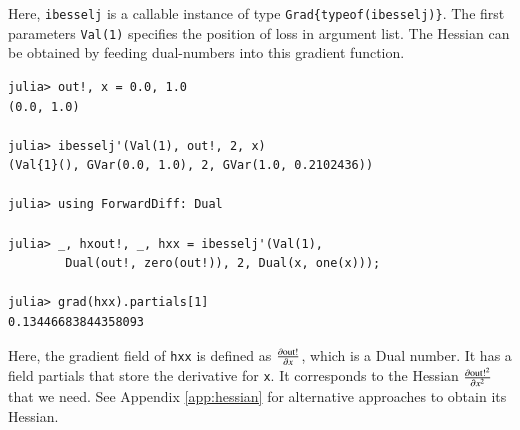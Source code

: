 \documentclass[aps,twocolumn,longbibliography,english,superscriptaddress]{revtex4-1}
\newcommand{\<}{\langle}
\renewcommand{\>}{\rangle}
\newcommand{\App}[1]{Appendix \ref{#1}}
\theoremstyle{definition}\newtheorem{definition}{\textit{Definition}}
\begin{document}
Here, \texttt{ibesselj\textquotesingle} is a callable instance of type \texttt{Grad\{typeof(ibesselj)\}}. The first parameters \texttt{Val(1)} specifies the position of loss in argument list. 
The Hessian can be obtained by feeding dual-numbers into this gradient function.

\begin{minipage}{.44\textwidth}
\begin{lstlisting}
julia> out!, x = 0.0, 1.0
(0.0, 1.0)

julia> ibesselj'(Val(1), out!, 2, x)
(Val{1}(), GVar(0.0, 1.0), 2, GVar(1.0, 0.2102436))

julia> using ForwardDiff: Dual

julia> _, hxout!, _, hxx = ibesselj'(Val(1), 
        Dual(out!, zero(out!)), 2, Dual(x, one(x)));

julia> grad(hxx).partials[1]
0.13446683844358093
\end{lstlisting}
\end{minipage}

Here, the gradient field of \texttt{hxx} is defined as $\frac{\partial {\rm out!}}{\partial x}$, which is a Dual number.
It has a field partials that store the derivative for \texttt{x}.
It corresponds to the Hessian $\frac{\partial{\rm out!}^2}{\partial x^2}$ that we need.
See \App{app:hessian} for alternative approaches to obtain its Hessian.
\end{document}
